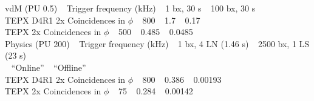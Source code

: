 vdM (PU 0.5) $\:\:$  Trigger frequency (kHz) $\:\:$ 1 bx, 30 s $\:\:$ 100 bx, 30 s \\
TEPX D4R1 2x Coincidences in $\phi$  $\:\:$  800        $\:\:$   1.7         $\:\:$       0.17   \\
TEPX 2x Coincidences in $\phi$   $\:\:$     500        $\:\:$   0.485       $\:\:$       0.0485   \\




Physics (PU 200)  $\:\:$ Trigger frequency (kHz)   $\:\:$   1 bx, 4 LN (1.46 s)   $\:\:$     2500 bx, 1 LS (23 s)  \\
                                                      $\:\:$           ``Online''          $\:\:$           ``Offline''      \\
TEPX D4R1 2x Coincidences in $\phi$  $\:\:$   800                $\:\:$   0.386           $\:\:$            0.00193         \\
TEPX 2x Coincidences in $\phi$       $\:\:$   75           $\:\:$         0.284           $\:\:$            0.00142         \\

